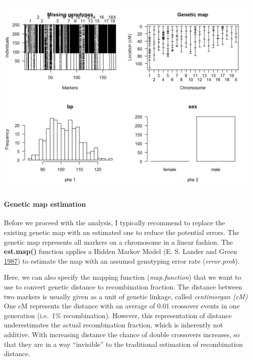 \documentclass[12pt,]{book}
\let\oldparagraph\paragraph
\renewcommand{\paragraph}[1]{\oldparagraph{#1}\mbox{}}
\theoremstyle{definition}
\theoremstyle{definition}
\theoremstyle{remark}
\begin{document}
\begin{center}\includegraphics{_main_files/figure-html/unnamed-chunk-4-1} \end{center}

\paragraph{Genetic map estimation}\label{genetic-map-estimation}

Before we proceed with the analysis, I typically recommend to replace
the existing genetic map with an estimated one to reduce the potential
errors. The genetic map represents all markers on a chromosome in a
linear fashion. The \textbf{est.map()} function applies a Hidden Markov
Model (E. S. Lander and Green
\protect\hyperlink{ref-Lander01041987}{1987}) to estimate the map with
an assumed genotyping error rate (\emph{error.prob}).

Here, we can also specify the mapping function (\emph{map.function})
that we want to use to convert genetic distance to recombination
fraction. The distance between two markers is usually given as a unit of
genetic linkage, called \emph{centimorgan (cM)} One cM represents the
distance with an average of 0.01 crossover events in one generation
(i.e.~1\% recombination). However, this representation of distance
underestimates the actual recombination fraction, which is inherently
not additive. With increasing distance the chance of double crossovers
increases, so that they are in a way ``invisible'' to the traditional
estimation of recombination distance.
\end{document}
